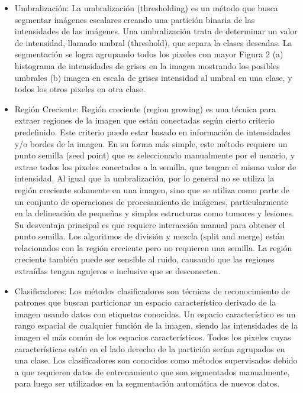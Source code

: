 \begin{itemize}
\item Umbralizaci\'on: La umbralizaci\'on (thresholding) es un m\'etodo que busca segmentar im\'agenes
escalares creando una partici\'on binaria de las intensidades de las im\'agenes. Una
umbralizaci\'on trata de determinar un valor de intensidad, llamado umbral (threshold), que
separa la clases deseadas. La segmentaci\'on se logra agrupando todos los pixeles con mayor
Figura 2 (a) histograma de intensidades de grises en la imagen mostrando los posibles
umbrales (b) imagen en escala de grises intensidad al umbral en una clase, y todos los otros pixeles en otra clase.
\item Regi\'on Creciente: Regi\'on creciente (region growing) es una t\'ecnica para extraer regiones de la imagen que est\'an conectadas seg\'un cierto criterio predefinido. Este criterio puede estar basado en
informaci\'on de intensidades y/o bordes de la imagen. En su forma más simple, este m\'etodo requiere un punto semilla (seed point) que es seleccionado manualmente por el usuario, y extrae todos los pixeles conectados a la semilla, que tengan el mismo valor de intensidad. Al igual que la umbralizaci\'on, por lo general no se utiliza la regi\'on creciente solamente en una imagen, sino que se utiliza como parte de un conjunto de operaciones de procesamiento de im\'agenes, particularmente en la delineaci\'on de pequeñas y simples estructuras como tumores y lesiones. Su desventaja principal es que requiere interacci\'on manual para obtener el punto semilla. Los algoritmos de divisi\'on y mezcla (split and merge) están relacionados con la regi\'on creciente pero no requieren una semilla. La regi\'on creciente tambi\'en puede ser sensible al ruido, causando que las regiones extra\'idas tengan agujeros e inclusive que se desconecten.
\item Clasificadores: Los m\'etodos clasificadores son t\'ecnicas de reconocimiento de patrones que buscan particionar un espacio caracter\'istico derivado de la imagen usando datos con etiquetas conocidas. Un espacio caracter\'istico es un rango espacial de cualquier funci\'on de la imagen, siendo las intensidades de la imagen el m\'as com\'un de los espacios caracter\'isticos. Todos los pixeles cuyas caracter\'isticas est\'en en el lado derecho de la partici\'on ser\'ian agrupados en una clase.
Los clasificadores son conocidos como m\'etodos supervisados debido a que requieren datos de entrenamiento que son segmentados manualmente, para luego ser utilizados en la segmentaci\'on autom\'atica de nuevos datos.

\end{itemize}
